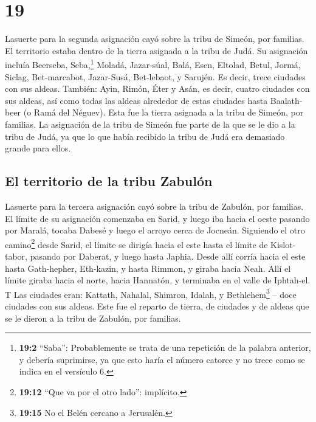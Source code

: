 \hypertarget{section-18}{%
\section{19}\label{section-18}}

 Lasuerte para la segunda asignación cayó sobre la tribu
de Simeón, por familias. El territorio estaba dentro de la tierra
asignada a la tribu de Judá.  Su asignación incluía
Beerseba, Seba,\footnote{\textbf{19:2} ``Saba'': Probablemente se trata
  de una repetición de la palabra anterior, y debería suprimirse, ya que
  esto haría el número catorce y no trece como se indica en el versículo
  6.} Moladá,  Jazar-súal, Balá, Esen, 
Eltolad, Betul, Jormá,  Siclag, Bet-marcabot, Jazar-Susá,
 Bet-lebaot, y Sarujén. Es decir, trece ciudades con sus
aldeas.  También: Ayin, Rimón, Éter y Asán, es decir,
cuatro ciudades con sus aldeas,  así como todas las aldeas
alrededor de estas ciudades hasta Baalath-beer (o Ramá del Néguev). Esta
fue la tierra asignada a la tribu de Simeón, por familias.
 La asignación de la tribu de Simeón fue parte de la que
se le dio a la tribu de Judá, ya que lo que había recibido la tribu de
Judá era demasiado grande para ellos.

\hypertarget{el-territorio-de-la-tribu-zabuluxf3n}{%
\subsection{El territorio de la tribu
Zabulón}\label{el-territorio-de-la-tribu-zabuluxf3n}}

 Lasuerte para la tercera asignación cayó sobre la tribu
de Zabulón, por familias. El límite de su asignación comenzaba en Sarid,
 y luego iba hacia el oeste pasando por Maralá, tocaba
Dabesé y luego el arroyo cerca de Jocneán.  Siguiendo el
otro camino\footnote{\textbf{19:12} ``Que va por el otro lado'':
  implícito.} desde Sarid, el límite se dirigía hacia el este hasta el
límite de Kislot-tabor, pasando por Daberat, y luego hasta Japhia.
 Desde allí corría hacia el este hasta Gath-hepher,
Eth-kazin, y hasta Rimmon, y giraba hacia Neah.  Allí el
límite giraba hacia el norte, hacia Hannatón, y terminaba en el valle de
Iphtah-el.  T Las ciudades eran: Kattath, Nahalal,
Shimron, Idalah, y Bethlehem\footnote{\textbf{19:15} No el Belén cercano
  a Jerusalén.} -- doce ciudades con sus aldeas.  Este
fue el reparto de tierra, de ciudades y de aldeas que se le dieron a la
tribu de Zabulón, por familias.


